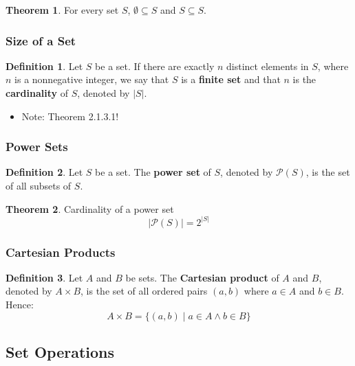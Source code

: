 \documentclass[article, 11pt]{article}
\theoremstyle{definition}
\newtheorem{theorem}{Theorem}[subsubsection]
\newtheorem{definition}{Definition}[subsubsection]
\newcommand{\powset}{\mathcal{P}} %
\begin{document}
    \begin{theorem}
        For every set $S$, $\emptyset \subseteq S$ and $S \subseteq S$.
    \end{theorem}
    \subsubsection{Size of a Set}
    \begin{definition}
        Let $S$ be a set. If there are exactly $n$ distinct elements in $S$, where $n$ is a nonnegative integer, we say that $S$ is a \textbf{finite set} and that $n$ is the \textbf{cardinality} of $S$, denoted by $|S|$.
        \begin{itemize}
            \item Note: Theorem 2.1.3.1!
        \end{itemize}
    \end{definition}
    \subsubsection{Power Sets}
    \begin{definition}
        Let $S$ be a set. The \textbf{power set} of $S$, denoted by $\powset(S)$, is the set of all subsets of $S$.
    \end{definition}
    \begin{theorem} Cardinality of a power set
        \begin{equation*}
            |\powset(S)| = 2^{|S|}
        \end{equation*}
    \end{theorem}
    \subsubsection{Cartesian Products}
    \begin{definition}
        Let $A$ and $B$ be sets. The \textbf{Cartesian product} of $A$ and $B$, denoted by $A \times B$, is the set of all ordered pairs $(a,b)$ where $a \in A$ and $b \in B$. Hence:
        \begin{equation*}
            A \times B = \{(a,b) \mid a \in A \land b \in B\}    
        \end{equation*}
    \end{definition}
    \subsection{Set Operations}
\end{document}
